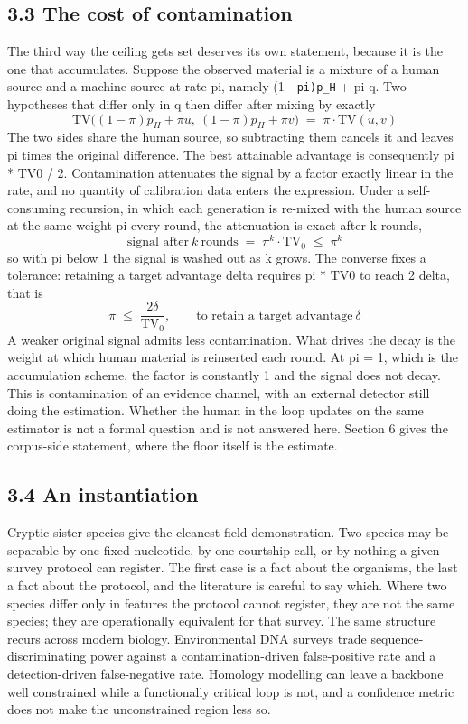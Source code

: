 \documentclass[11pt,a4paper]{article}
\theoremstyle{definition}
\theoremstyle{remark}
\begin{document}
\subsection*{3.3  The cost of contamination}
The third way the ceiling gets set deserves its own statement, because it is the one that accumulates. Suppose the observed material is a mixture of a human source and a machine source at rate pi, namely (1 - \texttt{pi)p\_\allowbreak{}H} + pi q. Two hypotheses that differ only in q then differ after mixing by exactly
\begin{equation}
\mathrm{TV}\big((1-\pi)p_H+\pi u,\ (1-\pi)p_H+\pi v\big)\;=\;\pi\cdot\mathrm{TV}(u,v)
\tag{9}
\end{equation}
The two sides share the human source, so subtracting them cancels it and leaves pi times the original difference. The best attainable advantage is consequently pi * TV0 / 2. Contamination attenuates the signal by a factor exactly linear in the rate, and no quantity of calibration data enters the expression.
Under a self-consuming recursion, in which each generation is re-mixed with the human source at the same weight pi every round, the attenuation is exact after k rounds,
\begin{equation}
\text{signal after}\ k\ \text{rounds}\;=\;\pi^{k}\cdot\mathrm{TV}_0\;\leq\;\pi^{k}
\tag{10}
\end{equation}
so with pi below 1 the signal is washed out as k grows. The converse fixes a tolerance: retaining a target advantage delta requires pi * TV0 to reach 2 delta, that is
\begin{equation}
\pi\;\leq\;\frac{2\delta}{\mathrm{TV}_0},\qquad\text{to retain a target advantage}\ \delta
\tag{11}
\end{equation}
A weaker original signal admits less contamination. What drives the decay is the weight at which human material is reinserted each round. At pi = 1, which is the accumulation scheme, the factor is constantly 1 and the signal does not decay.
This is contamination of an evidence channel, with an external detector still doing the estimation. Whether the human in the loop updates on the same estimator is not a formal question and is not answered here. Section 6 gives the corpus-side statement, where the floor itself is the estimate.
\subsection*{3.4  An instantiation}
Cryptic sister species give the cleanest field demonstration. Two species may be separable by one fixed nucleotide, by one courtship call, or by nothing a given survey protocol can register. The first case is a fact about the organisms, the last a fact about the protocol, and the literature is careful to say which. Where two species differ only in features the protocol cannot register, they are not the same species; they are operationally equivalent for that survey. The same structure recurs across modern biology. Environmental DNA surveys trade sequence-discriminating power against a contamination-driven false-positive rate and a detection-driven false-negative rate. Homology modelling can leave a backbone well constrained while a functionally critical loop is not, and a confidence metric does not make the unconstrained region less so.
\end{document}
